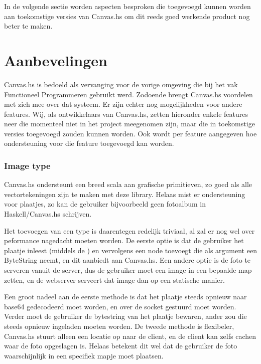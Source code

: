 In de volgende sectie worden aspecten besproken die toegevoegd kunnen worden aan toekomstige versies van Canvas.hs om dit reeds goed werkende product nog beter te maken. 

\section{Aanbevelingen} \label{sec:aanbevelingen}
Canvas.hs is bedoeld als vervanging voor de vorige omgeving die bij het vak Functioneel Programmeren gebruikt werd. Zodoende brengt Canvas.hs voordelen met zich mee over dat systeem. Er zijn echter nog mogelijkheden voor andere features. Wij, als ontwikkelaars van Canvas.hs, zetten hieronder enkele features neer die momenteel niet in het project meegenomen zijn, maar die in toekomstige versies toegevoegd zouden kunnen worden. Ook wordt per feature aangegeven hoe ondersteuning voor die feature toegevoegd kan worden.

\subsubsection{Image type}
Canvas.hs ondersteunt een breed scala aan grafische primitieven, zo goed als alle vectortekeningen zijn te maken met deze library. Helaas mist er ondersteuning voor plaatjes, zo kan de gebruiker bijvoorbeeld geen fotoalbum in Haskell/Canvas.hs schrijven.

Het toevoegen van een  type is daarentegen redelijk triviaal, al zal er nog wel over peformance nagedacht moeten worden. De eerste optie is dat de gebruiker het plaatje inleest (middels de ) en vervolgens een  node toevoegt die als argument een ByteString neemt, en dit aanbiedt aan Canvas.hs. Een andere optie is de foto te serveren vanuit de server, dus de gebruiker moet een image in een bepaalde map zetten, en de webserver serveert dat image dan op een statische manier.

Een groot nadeel aan de eerste methode is dat het plaatje steeds opnieuw naar base64 gedecodeerd moet worden, en over de socket gestuurd moet worden. Verder moet de gebruiker de bytestring van het plaatje bewaren, ander zou die steeds opnieuw ingeladen moeten worden. De tweede methode is flexibeler, Canvas.hs stuurt alleen een locatie op naar de client, en de client kan zelfs cachen waar de foto opgeslagen is. Helaas betekent dit wel dat de gebruiker de foto waarschijnlijk in een specifiek mapje moet plaatsen.

